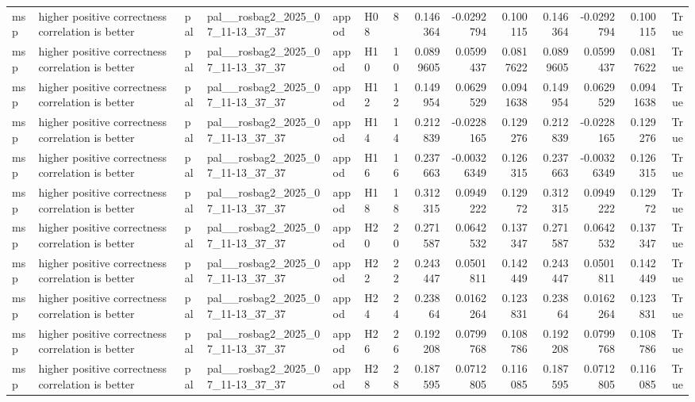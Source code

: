 \begin{longtable}{llllllrrrrrrrr}
msp & higher positive correctness correlation is better & pal & pal\_\_rosbag2\_2025\_07\_11-13\_37\_37 & appod & H08 & 8 & 0.146364 & -0.0292794 & 0.100115 & 0.146364 & -0.0292794 & 0.100115 & True \\
msp & higher positive correctness correlation is better & pal & pal\_\_rosbag2\_2025\_07\_11-13\_37\_37 & appod & H10 & 10 & 0.0899605 & 0.0599437 & 0.0817622 & 0.0899605 & 0.0599437 & 0.0817622 & True \\
msp & higher positive correctness correlation is better & pal & pal\_\_rosbag2\_2025\_07\_11-13\_37\_37 & appod & H12 & 12 & 0.149954 & 0.0629529 & 0.0941638 & 0.149954 & 0.0629529 & 0.0941638 & True \\
msp & higher positive correctness correlation is better & pal & pal\_\_rosbag2\_2025\_07\_11-13\_37\_37 & appod & H14 & 14 & 0.212839 & -0.0228165 & 0.129276 & 0.212839 & -0.0228165 & 0.129276 & True \\
msp & higher positive correctness correlation is better & pal & pal\_\_rosbag2\_2025\_07\_11-13\_37\_37 & appod & H16 & 16 & 0.237663 & -0.00326349 & 0.126315 & 0.237663 & -0.00326349 & 0.126315 & True \\
msp & higher positive correctness correlation is better & pal & pal\_\_rosbag2\_2025\_07\_11-13\_37\_37 & appod & H18 & 18 & 0.312315 & 0.0949222 & 0.12972 & 0.312315 & 0.0949222 & 0.12972 & True \\
msp & higher positive correctness correlation is better & pal & pal\_\_rosbag2\_2025\_07\_11-13\_37\_37 & appod & H20 & 20 & 0.271587 & 0.0642532 & 0.137347 & 0.271587 & 0.0642532 & 0.137347 & True \\
msp & higher positive correctness correlation is better & pal & pal\_\_rosbag2\_2025\_07\_11-13\_37\_37 & appod & H22 & 22 & 0.243447 & 0.0501811 & 0.142449 & 0.243447 & 0.0501811 & 0.142449 & True \\
msp & higher positive correctness correlation is better & pal & pal\_\_rosbag2\_2025\_07\_11-13\_37\_37 & appod & H24 & 24 & 0.23864 & 0.0162264 & 0.123831 & 0.23864 & 0.0162264 & 0.123831 & True \\
msp & higher positive correctness correlation is better & pal & pal\_\_rosbag2\_2025\_07\_11-13\_37\_37 & appod & H26 & 26 & 0.192208 & 0.0799768 & 0.108786 & 0.192208 & 0.0799768 & 0.108786 & True \\
msp & higher positive correctness correlation is better & pal & pal\_\_rosbag2\_2025\_07\_11-13\_37\_37 & appod & H28 & 28 & 0.187595 & 0.0712805 & 0.116085 & 0.187595 & 0.0712805 & 0.116085 & True \\

\end{longtable}
